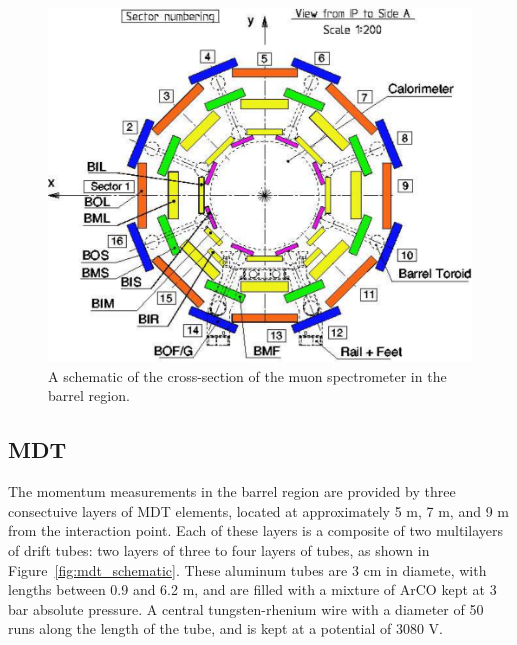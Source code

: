 \begin{figure}[hbtp]
\includegraphics[width=\fullfig]{figures/muon_barrel_schematic.pdf}
\caption{A schematic of the cross-section of the muon spectrometer in the barrel region.}
\label{fig:muon_barrel_schematic}
\end{figure}


\subsection{\acl{MDT}}
\label{sec:mdt}
The momentum measurements in the barrel region are provided by three consectuive layers of \ac{MDT} elements, located at approximately 5 m, 7 m, and 9 m from the interaction point.
Each of these layers is a composite of two multilayers of drift tubes: two layers of three to four layers of tubes, as shown in Figure~\ref{fig:mdt_schematic}.
These aluminum tubes are 3 cm in diamete, with lengths between 0.9 and 6.2 m, and are filled with a mixture of ArCO kept at 3 bar absolute pressure.
A central tungsten-rhenium wire with a diameter of 50 \um runs along the length of the tube, and is kept at a potential of 3080 V.

